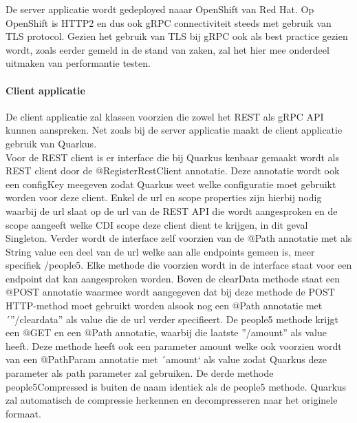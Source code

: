 De server applicatie wordt gedeployed naaar OpenShift van Red Hat. Op OpenShift is HTTP2 en dus ook gRPC connectiviteit steeds met gebruik van TLS protocol.
Gezien het gebruik van TLS bij gRPC ook als best practice gezien wordt, zoals eerder gemeld in de stand van zaken, zal het hier mee onderdeel uitmaken van performantie testen.\newline
~\autocite{openshifttls}

\paragraph{Client applicatie}

De client applicatie zal klassen voorzien die zowel het REST als gRPC API kunnen aanspreken.
Net zoals bij de server applicatie maakt de client applicatie gebruik van Quarkus.\\

Voor de REST client is er interface die bij Quarkus kenbaar gemaakt wordt als REST client door de @RegisterRestClient annotatie. Deze annotatie wordt ook een configKey meegeven
zodat Quarkus weet welke configuratie moet gebruikt worden voor deze client.  Enkel de url en scope properties zijn hierbij nodig waarbij de url slaat op de url van de
REST API die wordt aangesproken en de scope aangeeft welke CDI scope deze client dient te krijgen, in dit geval Singleton.
Verder wordt de interface zelf voorzien van de @Path annotatie met als String value een deel van de url welke
aan alle endpoints gemeen is, meer specifiek /people5. Elke methode die voorzien wordt in de interface staat voor een endpoint dat kan aangesproken worden.
Boven de clearData methode staat een @POST annotatie waarmee wordt aangegeven dat bij deze methode de POST HTTP-method moet gebruikt worden alsook
nog een @Path annotatie met ´''/cleardata'' als value die de url verder specifieert. De people5 methode krijgt een @GET en een @Path annotatie, waarbij die laatste ''/{amount}''
als value heeft. Deze methode heeft ook een parameter amount welke ook voorzien wordt van een @PathParam annotatie met ´amount` als value zodat Quarkus
deze parameter als path parameter zal gebruiken. De derde methode people5Compressed is buiten de naam identiek als de people5 methode. Quarkus zal automatisch de compressie
herkennen en decompresseren naar het originele formaat.
~\autocite{quarkusRESTclient}\\

